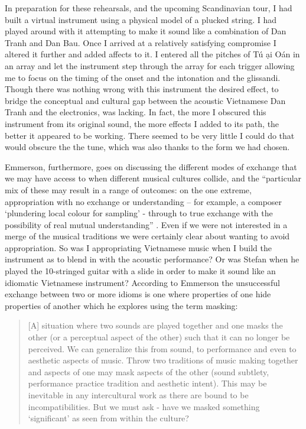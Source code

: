 \documentclass[a4paper]{article}
\begin{document}
In preparation for these rehearsals, and the upcoming Scandinavian tour, I had built a virtual instrument using a physical model of a plucked string. I had played around with it attempting to make it sound like a combination of Dan Tranh and Dan Bau. Once I arrived at a relatively satisfying compromise I altered it further and added affects to it. I entered all the pitches of T\'{u} \DH \d{a}i O\'{a}n in an array and let the instrument step through the array for each trigger allowing me to focus on the timing of the onset and the intonation and the glissandi. Though there was nothing wrong with this instrument the desired effect, to bridge the conceptual and cultural gap between the acoustic Vietnamese Dan Tranh and the electronics, was lacking. In fact, the more I obscured this instrument from its original sound, the more effects I added to its path, the better it appeared to be working. There seemed to be very little I could do that would obscure the the tune, which was also thanks to the form we had chosen.

Emmerson, furthermore, goes on discussing the different modes of exchange that we may have access to when different musical cultures collide, and the ``particular mix of these may result in a range of outcomes: on the one extreme, appropriation with no exchange or understanding – for example, a composer ‘plundering local colour for sampling’ - through to true exchange with the possibility of real mutual understanding'' \citep{emmerson06}. Even if we were not interested in a merge of the musical traditions we were certainly clear about wanting to avoid appropriation. So was I appropriating Vietnamese music when I build the instrument as to blend in with the acoustic performance? Or was Stefan when he played the 10-stringed guitar with a slide in order to make it sound like an idiomatic Vietnamese instrument? According to Emmerson the unsuccessful exchange between two or more idioms is one where properties of one hide properties of another which he explores using the term masking:

\begin{quote}
  [A] situation where two sounds are played together and one masks the other (or a perceptual aspect of the other) such that it can no longer be perceived. We can generalize this from sound, to performance and even to aesthetic aspects of music. Throw two traditions of music making together and aspects of one may mask aspects of the other (sound subtlety, performance practice tradition and aesthetic intent). This may be inevitable in any intercultural work as there are bound to be incompatibilities. But we must ask - have we masked something ‘significant’ as seen from within the culture? \citep{emmerson06}
\end{quote}
\end{document}
